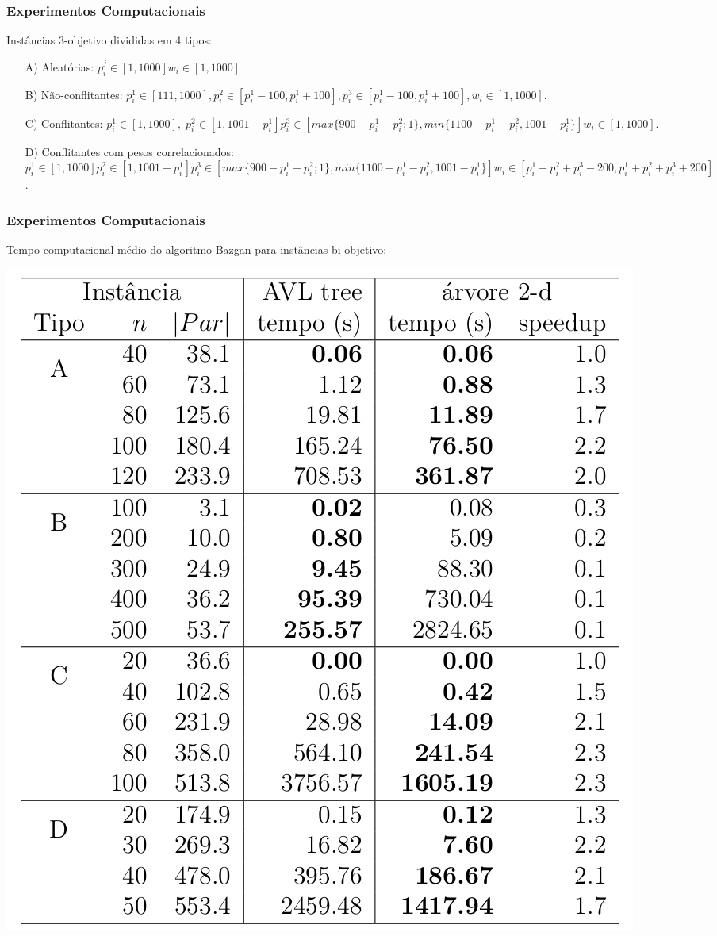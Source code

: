 \documentclass[10pt,xcolor=table,fleqn]{beamer}
\begin{document}
\begin{frame}
  \frametitle{Experimentos Computacionais}
  Instâncias $3$-objetivo divididas em 4 tipos:
  \begin{enumerate}
    \item[A)] Aleatórias: $
      p^j_i \in [1, 1000]
      w_i \in [1,1000]$
    \vspace{3mm}
    \item[B)] Não-conflitantes: $
      p^1_i \in [111, 1000],
      p^2_i \in [p^1_i - 100, p^1_i + 100],
      p^3_i \in [p^1_i - 100, p^1_i + 100],
      w_i \in [1,1000]$.
    \vspace{3mm}
    \item[C)] Conflitantes: $
      p^1_i \in [1, 1000], \;
      p^2_i \in [1, 1001 - p^1_i]
      p^3_i \in [max\{900-p^1_i-p^2_i;1\}, min\{1100-p^1_i-p^2_i, 1001-p^1_i\}]
      w_i \in [1,1000]$.
    \vspace{3mm}
    \item[D)] Conflitantes com pesos correlacionados: $
      p^1_i \in [1, 1000]
      p^2_i \in [1, 1001 - p^1_i]
      p^3_i \in [max\{900-p^1_i-p^2_i;1\}, min\{1100-p^1_i-p^2_i, 1001-p^1_i\}]
      w_i \in [p^1_i+p^2_i+p^3_i-200, p^1_i+p^2_i+p^3_i+200]$.
  \end{enumerate}
\end{frame}

\begin{frame}
  \frametitle{Experimentos Computacionais}
  Tempo computacional médio do algoritmo Bazgan para instâncias bi-objetivo:
  \scriptsize
  \begin{table}[h]
    \includegraphics[scale=0.3]{../tab/cpu2dim}
  \end{table}
\end{frame}
\end{document}
